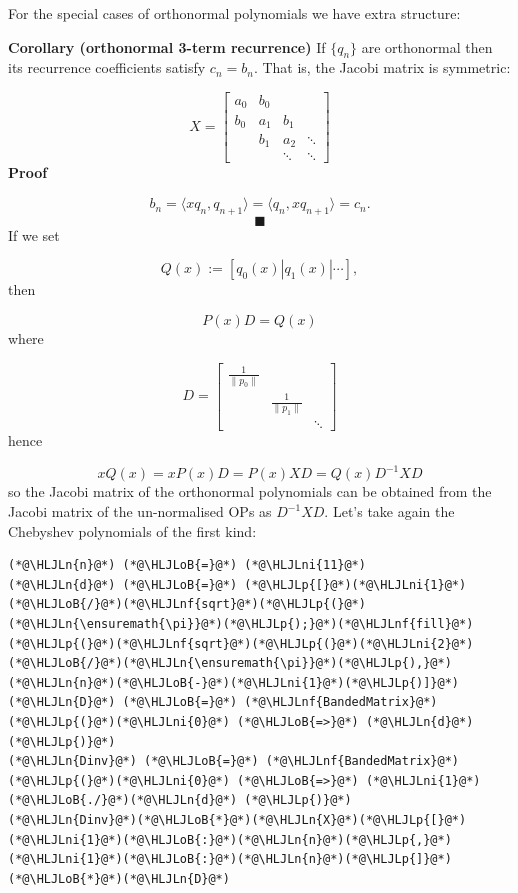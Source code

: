 \documentclass[12pt,a4paper]{article}
\newcommand{\HLJLn}[1]{#1}
\newcommand{\HLJLnf}[1]{\textcolor[RGB]{66,102,213}{#1}}
\newcommand{\HLJLni}[1]{\textcolor[RGB]{59,151,46}{#1}}
\newcommand{\HLJLoB}[1]{\textcolor[RGB]{102,102,102}{\textbf{#1}}}
\newcommand{\HLJLp}[1]{#1}
\begin{document}
For the special cases of orthonormal polynomials we have extra structure:

\textbf{Corollary (orthonormal 3-term recurrence)} If $\{q_n\}$ are orthonormal then its recurrence coefficients satisfy $c_n = b_n$. That is, the Jacobi matrix is symmetric:

\[
X = \begin{bmatrix} a_0 & b_0 \\
                                                        b_0 & a_1 & b_1\\
                                                        & b_1 & a_2 & \ensuremath{\ddots} \\
                                                        && \ensuremath{\ddots} & \ensuremath{\ddots}
                                                        \end{bmatrix}
\]
\textbf{Proof}

\[
b_n = \ensuremath{\langle}x q_n, q_{n+1}\ensuremath{\rangle} = \ensuremath{\langle}q_n, x q_{n+1}\ensuremath{\rangle} = c_{n}.
\]
\[
\blacksquare
\]
If we set

\[
Q(x) := [q_0(x) | q_1(x) | \ensuremath{\cdots}],
\]
then

\[
P(x)D = Q(x)
\]
where

\[
D = \begin{bmatrix}
\frac{1}{\|p_0 \|} &   &     \\
                   & \frac{1}{\|p_1 \|} &   \\
                   &                    & \ddots
\end{bmatrix}
\]
hence 

\[
xQ(x) = xP(x)D = P(x)XD = Q(x)D^{-1}XD
\]
so the Jacobi matrix of the orthonormal polynomials can be obtained from the Jacobi matrix of the un-normalised OPs as $D^{-1}XD$.  Let's take again the Chebyshev polynomials of the first kind:


\begin{lstlisting}
(*@\HLJLn{n}@*) (*@\HLJLoB{=}@*) (*@\HLJLni{11}@*)
(*@\HLJLn{d}@*) (*@\HLJLoB{=}@*) (*@\HLJLp{[}@*)(*@\HLJLni{1}@*)(*@\HLJLoB{/}@*)(*@\HLJLnf{sqrt}@*)(*@\HLJLp{(}@*)(*@\HLJLn{\ensuremath{\pi}}@*)(*@\HLJLp{);}@*)(*@\HLJLnf{fill}@*)(*@\HLJLp{(}@*)(*@\HLJLnf{sqrt}@*)(*@\HLJLp{(}@*)(*@\HLJLni{2}@*)(*@\HLJLoB{/}@*)(*@\HLJLn{\ensuremath{\pi}}@*)(*@\HLJLp{),}@*)(*@\HLJLn{n}@*)(*@\HLJLoB{-}@*)(*@\HLJLni{1}@*)(*@\HLJLp{)]}@*)
(*@\HLJLn{D}@*) (*@\HLJLoB{=}@*) (*@\HLJLnf{BandedMatrix}@*)(*@\HLJLp{(}@*)(*@\HLJLni{0}@*) (*@\HLJLoB{=>}@*) (*@\HLJLn{d}@*)(*@\HLJLp{)}@*)
(*@\HLJLn{Dinv}@*) (*@\HLJLoB{=}@*) (*@\HLJLnf{BandedMatrix}@*)(*@\HLJLp{(}@*)(*@\HLJLni{0}@*) (*@\HLJLoB{=>}@*) (*@\HLJLni{1}@*) (*@\HLJLoB{./}@*)(*@\HLJLn{d}@*) (*@\HLJLp{)}@*)
(*@\HLJLn{Dinv}@*)(*@\HLJLoB{*}@*)(*@\HLJLn{X}@*)(*@\HLJLp{[}@*)(*@\HLJLni{1}@*)(*@\HLJLoB{:}@*)(*@\HLJLn{n}@*)(*@\HLJLp{,}@*)(*@\HLJLni{1}@*)(*@\HLJLoB{:}@*)(*@\HLJLn{n}@*)(*@\HLJLp{]}@*)(*@\HLJLoB{*}@*)(*@\HLJLn{D}@*)
\end{lstlisting}
\end{document}

